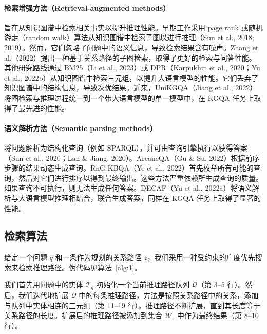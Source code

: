 \documentclass[11pt,UTF8,fontset=fandol]{ctexart}
\begin{document}
\paragraph{检索增强方法（Retrieval-augmented methods）}
旨在从知识图谱中检索相关事实以提升推理性能。早期工作采用 page rank 或随机游走（random walk）算法从知识图谱中检索子图以进行推理（Sun et al., 2018; 2019）。然而，它们忽略了问题中的语义信息，导致检索结果含有噪声。Zhang et al.（2022）提出一种基于关系路径的子图检索，取得了更好的检索与问答性能。其他研究路线通过 BM25（Li et al., 2023）或 DPR（Karpukhin et al., 2020；Yu et al., 2022b）从知识图谱中检索三元组，以提升大语言模型的性能。它们丢弃了知识图谱中的结构信息，导致次优结果。近来，UniKGQA（Jiang et al., 2022）将图检索与推理过程统一到一个带大语言模型的单一模型中，在 KGQA 任务上取得了最先进的性能。

\paragraph{语义解析方法（Semantic parsing methods）}
将问题解析为结构化查询（例如 SPARQL），并可由查询引擎执行以获得答案（Sun et al., 2020；Lan \& Jiang, 2020）。ArcaneQA（Gu \& Su, 2022）根据前序步骤的结果动态生成查询。RnG-KBQA（Ye et al., 2022）首先枚举所有可能的查询，然后对它们进行排序以得到最终输出。这些方法严重依赖所生成查询的质量。如果查询不可执行，则无法生成任何答案。DECAF（Yu et al., 2022a）将语义解析与大语言模型推理相结合，联合生成答案，同样在 KGQA 任务上取得了显著的性能。

\subsection{检索算法}
\label{app:a3}

给定一个问题 $q$ 和一条作为规划的关系路径 $z$，我们采用一种受约束的广度优先搜索来检索推理路径。伪代码见算法~\ref{alg:1}。

我们首先用问题中的实体 $\mathcal{T}_q$ 初始化一个当前推理路径队列 $\mathcal{Q}$（第 3--5 行）。然后，我们迭代地扩展 $\mathcal{Q}$ 中的每条推理路径，方法是按照关系路径中的关系，添加与队列中实体相连的三元组（第 11--19 行）。推理路径不断扩展，直到其长度等于关系路径的长度。扩展后的推理路径被添加到集合 $\mathcal{W}_z$ 中作为最终结果（第 8--10 行）。
\end{document}
